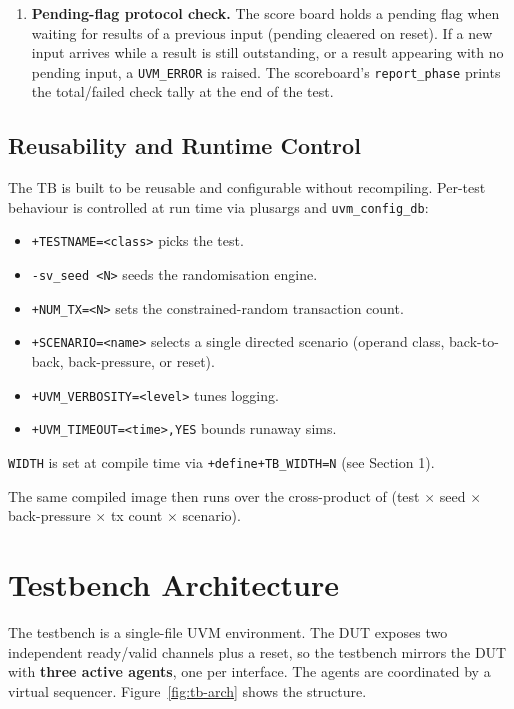 \documentclass[11pt,a4paper]{article}
\begin{document}
{\begin{enumerate}
    \item \textbf{Pending-flag protocol check.} The score board holds a pending flag when waiting for results of a previous input (pending cleaered on reset). If a new input arrives while a result is still outstanding, or a result appearing with no pending input, a \texttt{UVM\_ERROR} is raised. The scoreboard's \texttt{report\_phase} prints the total/failed check tally at the end of the test.
\end{enumerate}

\subsection{Reusability and Runtime Control}

The TB is built to be reusable and configurable without recompiling. Per-test behaviour is controlled at run time via plusargs and \texttt{uvm\_config\_db}:

\begin{itemize}
    \item \texttt{+TESTNAME=<class>} picks the test.
    \item \texttt{-sv\_seed <N>} seeds the randomisation engine.
    \item \texttt{+NUM\_TX=<N>} sets the constrained-random transaction count.
    \item \texttt{+SCENARIO=<name>} selects a single directed scenario (operand class, back-to-back, back-pressure, or reset).
    \item \texttt{+UVM\_VERBOSITY=<level>} tunes logging.
    \item \texttt{+UVM\_TIMEOUT=<time>,YES} bounds runaway sims.
\end{itemize}

\texttt{WIDTH} is set at compile time via \texttt{+define+TB\_WIDTH=N} (see Section 1).

The same compiled image then runs over the cross-product of (test $\times$ seed $\times$ back-pressure $\times$ tx count $\times$ scenario).



\section{Testbench Architecture}

The testbench is a single-file UVM environment. The DUT exposes two independent
ready/valid channels plus a reset, so the testbench mirrors the DUT with
\textbf{three active agents}, one per interface. The agents are coordinated by a virtual
sequencer. Figure~\ref{fig:tb-arch} shows the structure.

}
\end{document}
